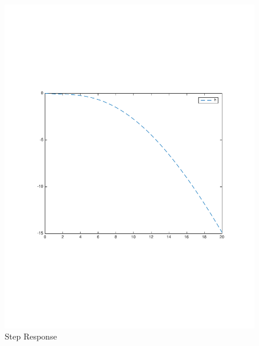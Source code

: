 \documentclass[12pt]{article}
\begin{document}
\begin{figure}[h]
\begin{center}
\includegraphics[width=1\textwidth]{figures/h}
\caption{Step Response}
\end{center}
\end{figure}
\end{document}
